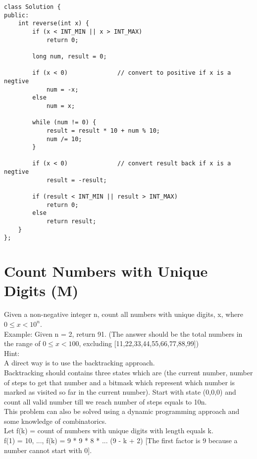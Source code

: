 \begin{lstlisting}
class Solution {
public:
    int reverse(int x) {
        if (x < INT_MIN || x > INT_MAX)
            return 0;
        
        long num, result = 0;
        
        if (x < 0)              // convert to positive if x is a negtive
            num = -x;
        else
            num = x;
            
        while (num != 0) {
            result = result * 10 + num % 10;
            num /= 10;
        }
        
        if (x < 0)              // convert result back if x is a negtive
            result = -result;

        if (result < INT_MIN || result > INT_MAX)
            return 0;
        else
            return result;
    }
};
\end{lstlisting}


\section{Count Numbers with Unique Digits (M)}
Given a non-negative integer n, count all numbers with unique digits, x, where $0 \leq x < 10^n$.\\

Example:
Given n = 2, return 91. (The answer should be the total numbers in the range of $0 \leq x < 100$, excluding [11,22,33,44,55,66,77,88,99]) \\

Hint:\\
    A direct way is to use the backtracking approach.\\
    Backtracking should contains three states which are (the current number, number of steps to get that number and a bitmask which represent which number is marked as visited so far in the current number). Start with state (0,0,0) and count all valid number till we reach number of steps equals to 10n.\\
    This problem can also be solved using a dynamic programming approach and some knowledge of combinatorics.\\
    Let f(k) = count of numbers with unique digits with length equals k.\\
    f(1) = 10, ..., f(k) = 9 * 9 * 8 * ... (9 - k + 2) [The first factor is 9 because a number cannot start with 0].\\

